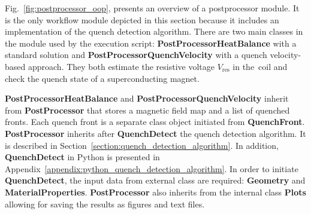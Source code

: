 Fig.~\ref{fig:postprocessor_oop}, presents an overview of a postprocessor module. It is the only workflow module depicted in this section because it includes an implementation of the quench detection algorithm. There are two main classes in the module used by the execution script: \textbf{PostProcessorHeatBalance} with a standard solution and \textbf{PostProcessorQuenchVelocity} with a quench velocity-based approach. They both estimate the resistive voltage $V_\text{res}$ in the~coil and check the quench state of a superconducting magnet. 

\textbf{PostProcessorHeatBalance} and \textbf{PostProcessorQuenchVelocity} inherit from \textbf{PostProcessor} that stores a magnetic field map and a list of quenched fronts. Each quench front is a separate class object initiated from \textbf{QuenchFront}. \textbf{PostProcessor} inherits after \textbf{QuenchDetect} the quench detection algorithm. It is described in Section~\ref{section:quench_detection_algorithm}. In addition, \textbf{QuenchDetect} in Python is presented in Appendix~\ref{appendix:python_quench_detection_algorithm}. In order to initiate \textbf{QuenchDetect}, the input data from external class are required: \textbf{Geometry} and \textbf{MaterialProperties}. \textbf{PostProcessor} also inherits from the internal class \textbf{Plots} allowing for saving the results as figures and text files.

